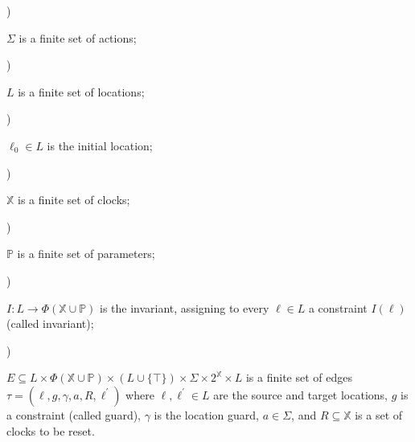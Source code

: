 \par{}) 
 
$\Sigma$ is a finite set of actions;\par
 
 
 
\par{}) 
 
$L$ is a finite set of locations;\par
 
 
 
\par{}) 
 
$\mathrm{\mathrm{\ell}_{0}}\in L$ is the initial location;\par
 
 
 
\par{}) 
 
$\mathbb{X}$ is a finite set of clocks;\par
 
 
 
\par{}) 
 
$\mathbb{P}$ is a finite set of parameters;\par
 
 
 
\par{}) 
 
$I:L\to\Phi(\mathbb{X}\cup\mathbb{P})$ is the invariant, assigning to every $\mathrm{\ell}\in L$ a constraint $I(\mathrm{\ell})$ (called invariant);\par
 
 
 
\par{}) 
 
$E\subseteq L\times\Phi(\mathbb{X}\cup\mathbb{P})\times\left(L\cup\{\top\}\right)\times\Sigma\times 2^{\mathbb{X}}\times L$ is a finite set of edges $\tau=(\mathrm{\ell},g,\gamma,a,R,\mathrm{\ell}^{\prime})$ where $\mathrm{\ell},\mathrm{\ell}^{\prime}\in L$ are the source and target locations, $g$ is a constraint (called guard), $\gamma$ is the location guard, $a\in\Sigma$, and $R\subseteq\mathbb{X}$ is a set of clocks to be reset.\par
 
